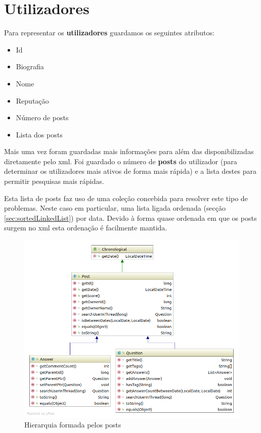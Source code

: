 \documentclass[10pt,a4paper]{report}
\begin{document}
    \section{Utilizadores}
    Para representar os \textbf{utilizadores} guardamos os seguintes atributos:
    \begin{multicols}{2}
    \begin{itemize}
        \item Id
        \item Biografia
        \item Nome
        \item Reputação
        \item Número de posts
        \item Lista dos posts
    \end{itemize}
    \end{multicols}
    Mais uma vez foram guardadas mais informações para além das disponibilizadas
    diretamente pelo xml. Foi guardado o número de \textbf{posts} do utilizador
    (para determinar os utilizadores mais ativos de forma mais rápida) e a lista
    destes para permitir pesquisas mais rápidas.

    Esta lista de posts faz uso de uma coleção concebida para resolver este
    tipo de problemas. Neste caso em particular, uma lista ligada ordenada
    (secção \ref{sec:sortedLinkedList}) por data. Devido à forma quase ordenada
    em que os posts surgem no xml esta ordenação é facilmente mantida.


    \begin{figure}[h]
        \centering
        \includegraphics[height=0.4\textheight]{./images/PostHierarchy.png}
        \caption{Hierarquia formada pelos posts}
    \end{figure}
\end{document}
